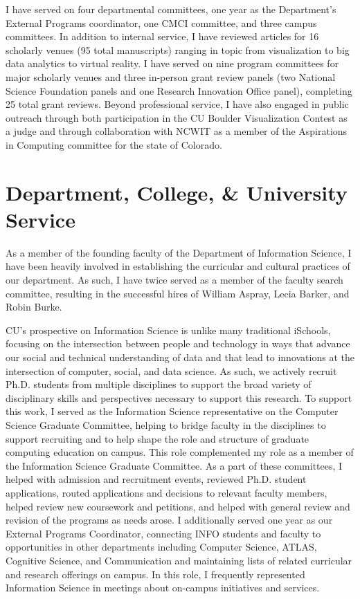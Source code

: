 \documentclass[11pt]{article}
\begin{document}
I have served on four departmental committees, one year as the Department's External Programs coordinator, one CMCI committee, and three campus committees. In addition to internal service, I have reviewed articles for 16 scholarly venues (95 total manuscripts) ranging in topic from visualization to big data analytics to virtual reality. I have served on nine program committees for major scholarly venues and three in-person grant review panels (two National Science Foundation panels and one Research Innovation Office panel), completing 25 total grant reviews. 
Beyond professional service, I have also engaged in public outreach through both participation in the CU Boulder Visualization Contest as a judge and through collaboration with NCWIT as a member of the Aspirations in Computing committee for the state of Colorado. 

\section*{Department, College, \& University Service}
As a member of the founding faculty of the Department of Information Science, I have been heavily involved in establishing the curricular and cultural practices of our department. As such, I have twice served as a member of the faculty search committee, resulting in the successful hires of William Aspray, Lecia Barker, and Robin Burke. 

CU's prospective on Information Science is unlike many traditional iSchools, focusing on the intersection between people and technology in ways that advance our social and technical understanding of data and that lead to innovations at the intersection of computer, social, and data science. As such, we actively recruit Ph.D. students from multiple disciplines to support the broad variety of disciplinary skills and perspectives necessary to support this research. To support this work, I served as the Information Science representative on the Computer Science Graduate Committee, helping to bridge faculty in the disciplines to support recruiting and to help shape the role and structure of graduate computing education on campus. This role complemented my role as a member of the Information Science Graduate Committee. As a part of these committees, I helped with admission and recruitment events, reviewed Ph.D. student applications, routed applications and decisions to relevant faculty members, helped review new coursework and petitions, and helped with general review and revision of the programs as needs arose. I additionally served one year as our External Programs Coordinator, connecting INFO students and faculty to opportunities in other departments including Computer Science, ATLAS, Cognitive Science, and Communication and maintaining lists of related curricular and research offerings on campus. In this role, I frequently represented Information Science in meetings about on-campus initiatives and services. 
\end{document}
